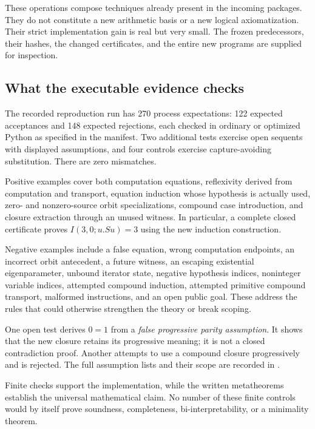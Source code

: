 \documentclass[11pt,a4paper]{article}
\theoremstyle{definition}
\begin{document}
These operations compose techniques already present in the incoming
packages. They do not constitute a new arithmetic basis or a new logical
axiomatization. Their strict implementation gain is real but very small.
The frozen predecessors, their hashes, the changed certificates, and the
entire new programs are supplied for inspection.

\subsection{What the executable evidence checks}

The recorded reproduction run has 270 process expectations: 122 expected
acceptances and 148 expected rejections, each checked in ordinary or
optimized Python as specified in the manifest. Two additional tests
exercise open sequents with displayed assumptions, and four controls
exercise capture-avoiding substitution. There are zero mismatches.

Positive examples cover both computation equations, reflexivity derived
from computation and transport, equation induction whose hypothesis is
actually used, zero- and nonzero-source orbit specializations, compound
case introduction, and closure extraction through an unused witness.
In particular, a complete closed certificate proves
$I(3,0;u.Su)=3$ using the new induction construction.

Negative examples include a false equation, wrong computation endpoints,
an incorrect orbit antecedent, a future witness, an escaping existential
eigenparameter, unbound iterator state, negative hypothesis indices,
noninteger variable indices, attempted compound induction, attempted
primitive compound transport, malformed instructions, and an open public
goal. These address the rules that could otherwise strengthen the theory
or break scoping.

One open test derives $0=1$ from a \emph{false progressive parity
assumption}. It shows that the new closure retains its progressive
meaning; it is not a closed contradiction proof. Another attempts to use
a compound closure progressively and is rejected. The full assumption
lists and their scope are recorded in .

Finite checks support the implementation, while the written
metatheorems establish the universal mathematical claim. No number of
these finite controls would by itself prove soundness, completeness,
bi-interpretability, or a minimality theorem.
\end{document}
